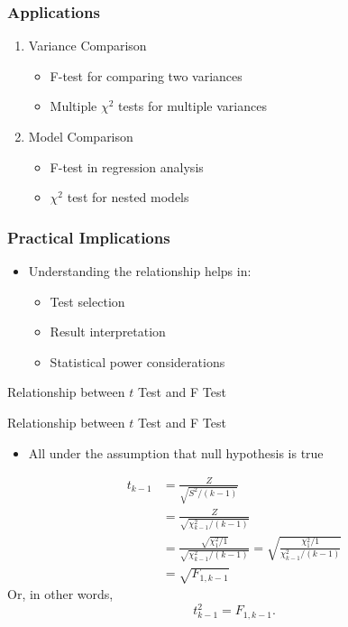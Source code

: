 \documentclass[12pt]{beamer}
\begin{document}
	\begin{frame}
		\frametitle{Applications}
		\begin{enumerate}[label={\color{blue}$\blacktriangleright$}]
			\item Variance Comparison
			\begin{itemize}[label={\color{blue}$\blacktriangleright$}]
				\item F-test for comparing two variances
				\item Multiple $\chi^2$ tests for multiple variances
			\end{itemize}
			\item Model Comparison
			\begin{itemize}[label={\color{blue}$\blacktriangleright$}]
				\item F-test in regression analysis
				\item $\chi^2$ test for nested models
			\end{itemize}
		\end{enumerate}
	\end{frame}
	
	\begin{frame}
		\frametitle{Practical Implications}
		\begin{itemize}[label={\color{blue}$\blacktriangleright$}]
			\item Understanding the relationship helps in:
			\begin{itemize}[label={\color{blue}$\blacktriangleright$}]
				\item Test selection
				\item Result interpretation
				\item Statistical power considerations
			\end{itemize}
		\end{itemize}
	\end{frame}
		\begin{frame}
		\vspace{1cm}
		\centering
		{\color{blue}\large Relationship between $t$ Test and F Test}
	\end{frame}
	
\begin{frame}{Relationship between $t$ Test and F Test}
\begin{itemize}[label={\color{blue}$\blacktriangleright$}]
	\item All under the assumption that null hypothesis is true
\end{itemize}
\begin{align*}
t_{k-1}&=\frac{Z}{\sqrt{S^2/(k-1)}}\\
&= \frac{Z}{\sqrt{\chi_{k-1}^2/(k-1)}}\\
&= \frac{\sqrt{\chi^2_1/1}}{\sqrt{\chi_{k-1}^2/(k-1)}}=\sqrt{\frac{\chi^2_1/1}{\chi_{k-1}^2/(k-1)}}\\
&= \sqrt{F_{1,k-1}}
\end{align*}
Or, in other words, 
$$t^2_{k-1} = F_{1,k-1}.$$

	
\end{frame}
			
\end{document}
